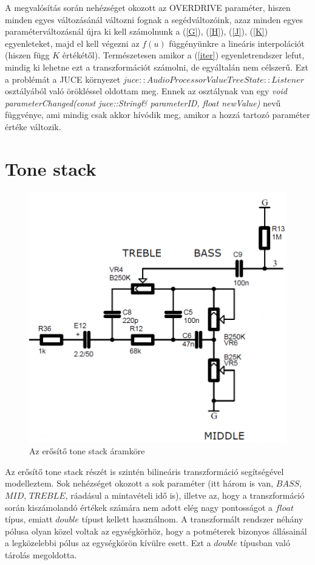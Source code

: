 A megvalósítás során nehézséget okozott az OVERDRIVE paraméter, hiszen minden egyes változásánál változni fognak a segédváltozóink, azaz minden egyes paraméterváltozásnál újra ki kell számolnunk a (\ref{G}), (\ref{H}), (\ref{J}), (\ref{K}) egyenleteket, majd el kell végezni az $f(u)$ függényünkre a lineáris interpolációt (hiszen függ $K$ értékétől). Természetesen amikor a (\ref{iter}) egyenletrendszer lefut, mindig ki lehetne ezt a transzformációt számolni, de egyáltalán nem célszerű. Ezt a problémát a JUCE környezet $juce::AudioProcessorValueTreeState::Listener$ osztályából való örökléssel oldottam meg. Ennek az osztálynak van egy \textit{void parameterChanged(const juce::String\& parameterID, float newValue)} nevű függvénye, ami mindig csak akkor hívódik meg, amikor a hozzá tartozó paraméter értéke változik.
\section{Tone stack}
\begin{figure}[H]
    \centering
    \includegraphics[scale=0.35]{figures/stage4.png}
    \caption{Az erősítő tone stack áramköre}
\end{figure}
Az erősítő tone stack részét is szintén bilineáris transzformáció segítségével modelleztem. Sok nehézséget okozott a sok paraméter (itt három is van, $BASS$, $MID$, $TREBLE$, ráadásul a mintavételi idő is), illetve az, hogy a transzformáció során kiszámolandó értékek számára nem adott elég nagy pontosságot a $float$ típus, emiatt $double$ típust kellett használnom. A transzformált rendszer néhány pólusa olyan közel voltak az egységkörhöz, hogy a potméterek bizonyos állásainál a legközelebbi pólus az egységkörön kívülre esett. Ezt a $double$ típusban való tárolás megoldotta. 

